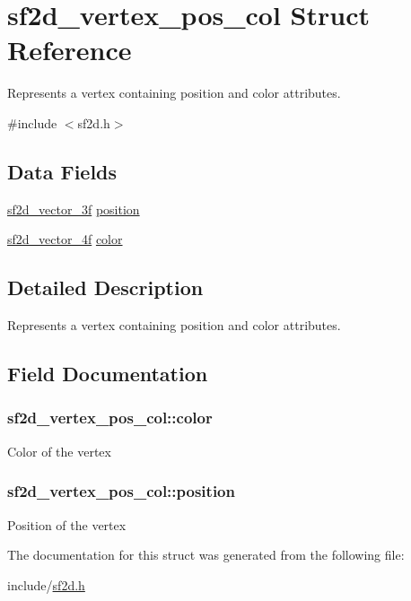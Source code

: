\hypertarget{structsf2d__vertex__pos__col}{\section{sf2d\-\_\-vertex\-\_\-pos\-\_\-col Struct Reference}
\label{structsf2d__vertex__pos__col}
}


Represents a vertex containing position and color attributes.  




{\ttfamily \#include $<$sf2d.\-h$>$}

\subsection*{Data Fields}
\begin{DoxyCompactItemize}
\item 
\hyperlink{structsf2d__vector__3f}{sf2d\-\_\-vector\-\_\-3f} \hyperlink{structsf2d__vertex__pos__col_a72c48b1c976984ef0512a28e8af7a1e4}{position}
\item 
\hyperlink{structsf2d__vector__4f}{sf2d\-\_\-vector\-\_\-4f} \hyperlink{structsf2d__vertex__pos__col_a9dcaaa5fac4047a013d1737f42e6b8e8}{color}
\end{DoxyCompactItemize}


\subsection{Detailed Description}
Represents a vertex containing position and color attributes. 

\subsection{Field Documentation}
\hypertarget{structsf2d__vertex__pos__col_a9dcaaa5fac4047a013d1737f42e6b8e8}{
\subsubsection[{color}]{ sf2d\-\_\-vertex\-\_\-pos\-\_\-col\-::color}}\label{structsf2d__vertex__pos__col_a9dcaaa5fac4047a013d1737f42e6b8e8}
Color of the vertex \hypertarget{structsf2d__vertex__pos__col_a72c48b1c976984ef0512a28e8af7a1e4}{
\subsubsection[{position}]{ sf2d\-\_\-vertex\-\_\-pos\-\_\-col\-::position}}\label{structsf2d__vertex__pos__col_a72c48b1c976984ef0512a28e8af7a1e4}
Position of the vertex 

The documentation for this struct was generated from the following file\-:\begin{DoxyCompactItemize}
\item 
include/\hyperlink{sf2d_8h}{sf2d.\-h}\end{DoxyCompactItemize}
